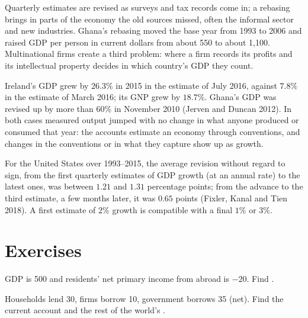 Quarterly estimates are revised as surveys and tax records come in; a
rebasing brings in parts of the economy the old sources missed, often the
informal sector and new industries. Ghana's rebasing moved the base year
from 1993 to 2006 and raised GDP per person in current dollars from about
550 to about 1,100. %
Multinational firms create a third problem: where a firm records its
profits and its intellectual property decides in which country's GDP they
count.

\begin{record}
Ireland's GDP grew by $26.3\%$ in 2015 in the estimate of July 2016, against
$7.8\%$ in the estimate of March 2016; its GNP grew by $18.7\%$.
Ghana's GDP was revised up by more than $60\%$ in November 2010 (Jerven and
Duncan 2012). %
In both cases measured output jumped with no change in what anyone
produced or consumed that year: the accounts estimate an economy through
conventions, and changes in the conventions or in what they capture show
up as growth.
\end{record}

\begin{record}
For the United States over 1993--2015, the average revision without
regard to sign, from the first quarterly estimates of GDP growth (at an
annual rate) to the latest ones, was between $1.21$ and $1.31$ percentage
points; from the advance to the third estimate, a few months later, it
was $0.65$ points (Fixler, Kanal and Tien 2018). %
A first estimate of $2\%$ growth is compatible with a final $1\%$ or $3\%$.
\end{record}

\section*{Exercises}\label{sec:b1:national-accounts-in-depth:exercises}

\begin{exercise}[$\star$]\label{exo:b1:national-accounts-in-depth:gni-ex}
GDP is 500 and residents' net primary income from abroad is $-20$. Find .
\end{exercise}

\begin{exercise}[$\star$]\label{exo:b1:national-accounts-in-depth:three}
Households lend 30, firms borrow 10, government borrows 35 (net). Find the
current account and the rest of the world's .
\end{exercise}

